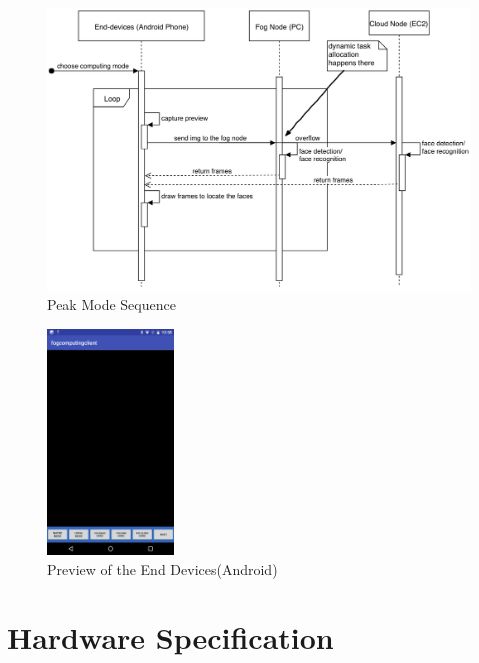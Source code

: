 \begin{figure}
    \centering
    \includegraphics[width=\textwidth]{images/cloud_mode.png}
    \caption{Peak Mode Sequence}
    \label{fig:peak_mode_sequence}
\end{figure}


\begin{figure}
    \centering
    \includegraphics[width=0.3\textwidth]{images/preview.png}
    \caption{Preview of the End Devices(Android)}
    \label{fig:preview}
\end{figure}

\section{Hardware Specification}


